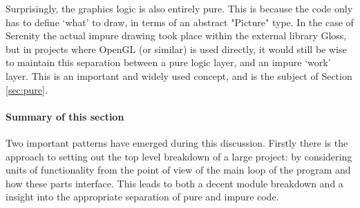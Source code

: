 Surprisingly, the graphics logic is also entirely pure. This is because the code only has to define `what' to draw, in terms of an abstract "Picture" type. In the case of Serenity the actual impure drawing took place within the external library Gloss, but in projects where OpenGL (or similar) is used directly, it would still be wise to maintain this separation between a pure logic layer, and an impure `work' layer. This is an important and widely used concept, and is the subject of Section \ref{sec:pure}.

\paragraph{Summary of this section} Two important patterns have emerged during this discussion. Firstly there is the approach to setting out the top level breakdown of a large project: by considering units of functionality from the point of view of the main loop of the program and how these parts interface. This leads to both a decent module breakdown and a insight into the appropriate separation of pure and impure code.
